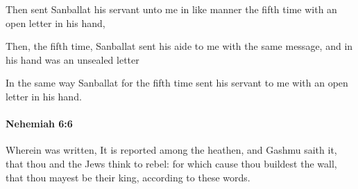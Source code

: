 			\begin{versebox}
					\item[BHS] 
					\item[LXX] 
					\item[ASV] Then sent Sanballat his servant unto me in like manner the fifth time with an open letter in his hand,
					\item[NIV] Then, the fifth time, Sanballat sent his aide to me with the same message, and in his hand was an unsealed letter
					\item[NRSV] In the same way Sanballat for the fifth time sent his servant to me with an open letter in his hand.
			\end{versebox}

		\paragraph{Nehemiah 6:6} %
			\label{NEHEMIAH-6-6}

			Wherein was written, It is reported among the heathen, and Gashmu saith it, that thou and the Jews think to rebel: for which cause thou buildest the wall, that thou mayest be their king, according to these words.

